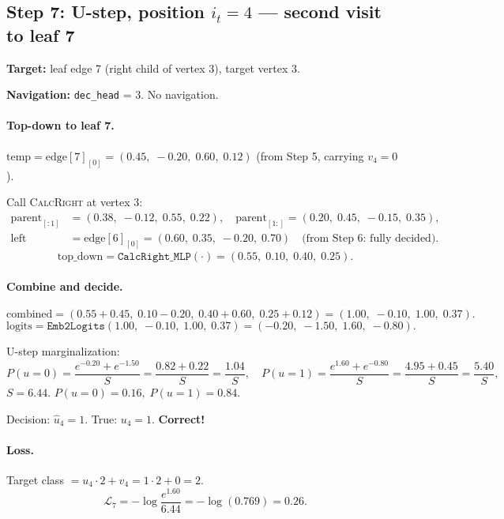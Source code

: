 \documentclass[11pt,a4paper]{article}
\newcommand{\calR}{\textsc{CalcRight}}
\begin{document}
\subsection{Step 7: U-step, position $i_t = 4$ --- second visit to leaf 7}

\textbf{Target:} leaf edge 7 (right child of vertex 3), target vertex 3.

\textbf{Navigation:} \texttt{dec\_head} = 3.  No navigation.

\paragraph{Top-down to leaf 7.}
$\text{temp} = \text{edge}[7]_{[0]} = (0.45,\; -0.20,\; 0.60,\; 0.12)$ (from Step 5, carrying $v_4 = 0$).

Call \calR{} at vertex 3:
\begin{align*}
\text{parent}_{[:1]} &= (0.38,\; -0.12,\; 0.55,\; 0.22), \quad
\text{parent}_{[1:]} = (0.20,\; 0.45,\; -0.15,\; 0.35), \\
\text{left} &= \text{edge}[6]_{[0]} = (0.60,\; 0.35,\; -0.20,\; 0.70) \quad \text{(from Step 6: fully decided)}.
\end{align*}
\[
\text{top\_down} = \texttt{CalcRight\_MLP}(\cdot) = (0.55,\; 0.10,\; 0.40,\; 0.25).
\]

\paragraph{Combine and decide.}
\[
\text{combined} = (0.55 + 0.45,\; 0.10 - 0.20,\; 0.40 + 0.60,\; 0.25 + 0.12) = (1.00,\; -0.10,\; 1.00,\; 0.37).
\]
\[
\text{logits} = \texttt{Emb2Logits}(1.00,\; -0.10,\; 1.00,\; 0.37) = (-0.20,\; -1.50,\; 1.60,\; -0.80).
\]

U-step marginalization:
\[
P(u{=}0) = \frac{e^{-0.20} + e^{-1.50}}{S} = \frac{0.82 + 0.22}{S} = \frac{1.04}{S}, \quad
P(u{=}1) = \frac{e^{1.60} + e^{-0.80}}{S} = \frac{4.95 + 0.45}{S} = \frac{5.40}{S},
\]
$S = 6.44$.  $P(u{=}0) = 0.16,\; P(u{=}1) = 0.84$.

Decision: $\hat{u}_4 = 1$.  True: $u_4 = 1$.  \textbf{Correct!}

\paragraph{Loss.}
Target class $= u_4 \cdot 2 + v_4 = 1 \cdot 2 + 0 = 2$.
\[
\mathcal{L}_7 = -\log \frac{e^{1.60}}{6.44} = -\log(0.769) = 0.26.
\]
\end{document}
